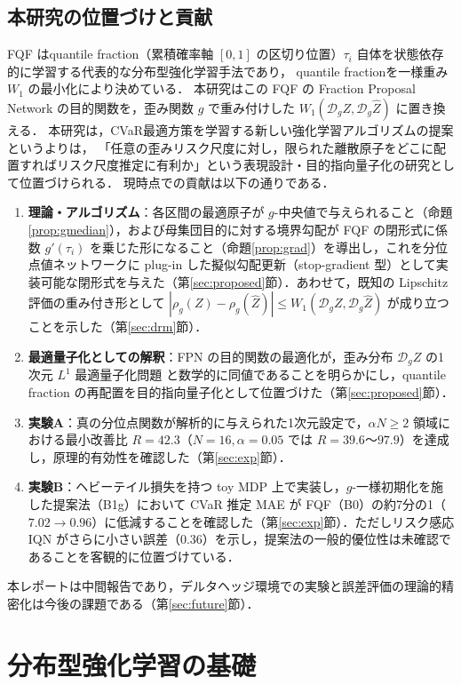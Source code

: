 \documentclass[a4paper,10pt]{jsarticle}
\theoremstyle{definition}
\newcommand{\Wone}{W_1}
\newcommand{\dist}{\mathcal{D}_g}
\begin{document}
\subsection{本研究の位置づけと貢献}
FQF \cite{yang2019fqf} はquantile fraction（累積確率軸 $[0, 1]$ の区切り位置）$\tau_i$ 自体を状態依存的に学習する代表的な分布型強化学習手法であり，
quantile fractionを一様重み $\Wone$ の最小化により決めている．
本研究はこの FQF の Fraction Proposal Network の目的関数を，歪み関数 $g$ で重み付けした $\Wone(\dist Z,\dist\hat{Z})$ に置き換える．
本研究は，CVaR最適方策を学習する新しい強化学習アルゴリズムの提案というよりは，
「任意の歪みリスク尺度に対し，限られた離散原子をどこに配置すればリスク尺度推定に有利か」という表現設計・目的指向量子化の研究として位置づけられる．
現時点での貢献は以下の通りである．
\begin{enumerate}
  \item \textbf{理論・アルゴリズム}：各区間の最適原子が $g$-中央値で与えられること（命題\ref{prop:gmedian}），および母集団目的に対する境界勾配が FQF の閉形式に係数 $g'(\tau_i)$ を乗じた形になること（命題\ref{prop:grad}）を導出し，これを分位点値ネットワークに plug-in した擬似勾配更新（stop-gradient 型）として実装可能な閉形式を与えた（第\ref{sec:proposed}節）．あわせて，既知の Lipschitz 評価の重み付き形として $|\rho_g(Z)-\rho_g(\hat Z)|\le \Wone(\dist Z,\dist \hat Z)$ が成り立つことを示した（第\ref{sec:drm}節）．
  \item \textbf{最適量子化としての解釈}：FPN の目的関数の最適化が，歪み分布 $\dist Z$ の1次元 $L^1$ 最適量子化問題 \cite{graf2000quantization} と数学的に同値であることを明らかにし，quantile fraction の再配置を目的指向量子化として位置づけた（第\ref{sec:proposed}節）．
  \item \textbf{実験A}：真の分位点関数が解析的に与えられた1次元設定で，$\alpha N\ge2$ 領域における最小改善比 $R=42.3$（$N=16, \alpha=0.05$ では $R=39.6$〜$97.9$）を達成し，原理的有効性を確認した（第\ref{sec:exp}節）．
  \item \textbf{実験B}：ヘビーテイル損失を持つ toy MDP 上で実装し，$g$-一様初期化を施した提案法（B1g）において CVaR 推定 MAE が FQF（B0）の約7分の1（$7.02\to0.96$）に低減することを確認した（第\ref{sec:exp}節）．ただしリスク感応 IQN がさらに小さい誤差（$0.36$）を示し，提案法の一般的優位性は未確認であることを客観的に位置づけている．
\end{enumerate}
本レポートは中間報告であり，デルタヘッジ環境での実験と誤差評価の理論的精密化は今後の課題である（第\ref{sec:future}節）．
\section{分布型強化学習の基礎}
\label{sec:drl}
\end{document}
